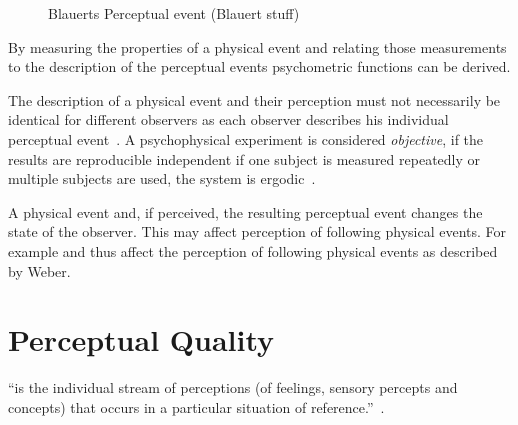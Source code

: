 \begin{figure}
	\caption{Blauerts Perceptual event (Blauert stuff)}
	\label{img:chap02:auditory-event}
\end{figure}

By measuring the properties of a physical event and relating those measurements to the description of the perceptual events psychometric functions can be derived.

The description of a physical event and their perception must not necessarily be identical for different observers as each observer describes his individual perceptual event~\cite[p. 11]{blauert_spatial_1996}.
A psychophysical experiment is considered \emph{objective}, if the results are reproducible independent if one subject is measured repeatedly or multiple subjects are used, \ie the system is ergodic~\cite[p. 11]{blauert_spatial_1996}.

A physical event and, if perceived, the resulting perceptual event changes the state of the observer.
This may affect perception of following physical events.
For example 
 and thus affect the perception of following physical events as described by Weber.


\section{Perceptual Quality}

\begin{definition}[Experiencing]
``is the individual stream of perceptions (of feelings, sensory percepts and concepts) that occurs in a particular situation of reference.''~\citep[p. 13]{moller_quality_2014}.
\end{definition}


